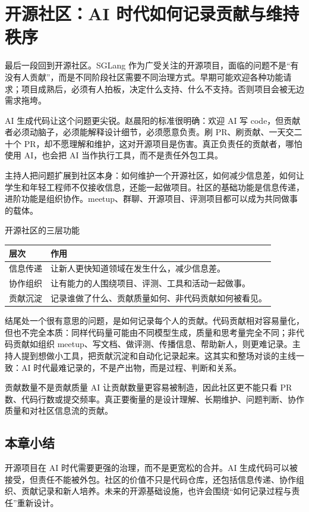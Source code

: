 \section{开源社区：AI 时代如何记录贡献与维持秩序}

最后一段回到开源社区。SGLang 作为广受关注的开源项目，面临的问题不是“有没有人贡献”，而是不同阶段社区需要不同治理方式。早期可能欢迎各种功能请求；项目成熟后，必须有人拍板，决定什么支持、什么不支持。否则项目会被无边需求拖垮。

AI 生成代码让这个问题更尖锐。赵晨阳的标准很明确：欢迎 AI 写 code，但贡献者必须动脑子，必须能解释设计细节，必须愿意负责。刷 PR、刷贡献、一天交二十个 PR，却不愿理解和维护，这对开源项目是伤害。真正负责任的贡献者，哪怕使用 AI，也会把 AI 当作执行工具，而不是责任外包工具。

主持人把问题扩展到社区本身：如何维护一个开源社区，如何减少信息差，如何让学生和年轻工程师不仅接收信息，还能一起做项目。社区的基础功能是信息传递，进阶功能是组织协作。meetup、群聊、开源项目、评测项目都可以成为共同做事的载体。

\begin{knowledgebox}{开源社区的三层功能}
\begin{tabularx}{\textwidth}{>{\raggedright\arraybackslash}p{} Y}
\toprule
层次 & 作用 \\
\midrule
信息传递 & 让新人更快知道领域在发生什么，减少信息差。 \\
协作组织 & 让有能力的人围绕项目、评测、工具和活动一起做事。 \\
贡献沉淀 & 记录谁做了什么、贡献质量如何、非代码贡献如何被看见。 \\
\bottomrule
\end{tabularx}
\end{knowledgebox}

结尾处一个很有意思的问题，是如何记录每个人的贡献。代码贡献相对容易量化，但也不完全本质：同样代码量可能由不同模型生成，质量和思考量完全不同；非代码贡献如组织 meetup、写文档、做评测、传播信息、帮助新人，则更难记录。主持人提到想做小工具，把贡献沉淀和自动化记录起来。这其实和整场对谈的主线一致：AI 时代最难记录的，不是产出物，而是过程、判断和关系。

\begin{warningbox}{贡献数量不是贡献质量}
AI 让贡献数量更容易被制造，因此社区更不能只看 PR 数、代码行数或提交频率。真正要衡量的是设计理解、长期维护、问题判断、协作质量和对社区信息流的贡献。
\end{warningbox}

\subsection{本章小结}

开源项目在 AI 时代需要更强的治理，而不是更宽松的合并。AI 生成代码可以被接受，但责任不能被外包。社区的价值不只是代码仓库，还包括信息传递、协作组织、贡献记录和新人培养。未来的开源基础设施，也许会围绕“如何记录过程与责任”重新设计。

